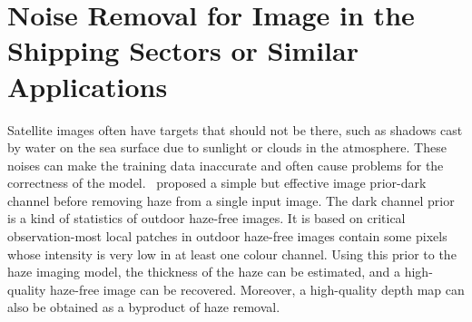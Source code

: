 \section{Noise Removal for Image in the Shipping Sectors or Similar Applications}
Satellite images often have targets that should not be there, such as shadows cast by water on the sea surface due to sunlight or clouds in the atmosphere. These noises can make the training data inaccurate and often cause problems for the correctness of the model.~ proposed a simple but effective image prior-dark channel before removing haze from a single input image. The dark channel prior is a kind of statistics of outdoor haze-free images. It is based on critical observation-most local patches in outdoor haze-free images contain some pixels whose intensity is very low in at least one colour channel. Using this prior to the haze imaging model, the thickness of the haze can be estimated, and a high-quality haze-free image can be recovered. Moreover, a high-quality depth map can also be obtained as a byproduct of haze removal.\\




